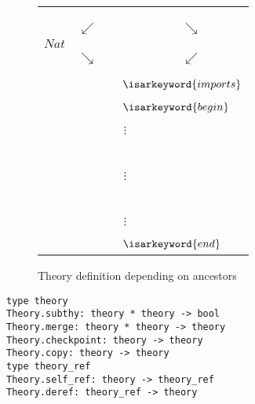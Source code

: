 \begin{isabellebody}
\begin{isamarkuptext}
  \begin{figure}[htb]
  \begin{center}
  \begin{tabular}{rcccl}
        &            & \isa{Pure} \\
        &            & \isa{{\isasymdown}} \\
        &            & \isa{FOL} \\
        & $\swarrow$ &              & $\searrow$ & \\
  $Nat$ &            &              &            & \isa{List} \\
        & $\searrow$ &              & $\swarrow$ \\
        &            & \isa{Length} \\
        &            & \multicolumn{3}{l}{~~$\isarkeyword{imports}$} \\
        &            & \multicolumn{3}{l}{~~$\isarkeyword{begin}$} \\
        &            & $\vdots$~~ \\
        &            & \isa{{\isasymbullet}}~~ \\
        &            & $\vdots$~~ \\
        &            & \isa{{\isasymbullet}}~~ \\
        &            & $\vdots$~~ \\
        &            & \multicolumn{3}{l}{~~$\isarkeyword{end}$} \\
  \end{tabular}
  \caption{Theory definition depending on ancestors}\label{fig:ex-theory}
  \end{center}
  \end{figure}%
\end{isamarkuptext}%
\isamarkuptrue%
%
\isadelimmlref
%
\endisadelimmlref
%
\isatagmlref
%
\begin{isamarkuptext}%
\begin{mldecls}
  \verb|type theory| \\
  \verb|Theory.subthy: theory * theory -> bool| \\
  \verb|Theory.merge: theory * theory -> theory| \\
  \verb|Theory.checkpoint: theory -> theory| \\
  \verb|Theory.copy: theory -> theory| \\[1ex]
  \verb|type theory_ref| \\
  \verb|Theory.self_ref: theory -> theory_ref| \\
  \verb|Theory.deref: theory_ref -> theory| \\
  \end{mldecls}


\end{isamarkuptext}
\end{isabellebody}
